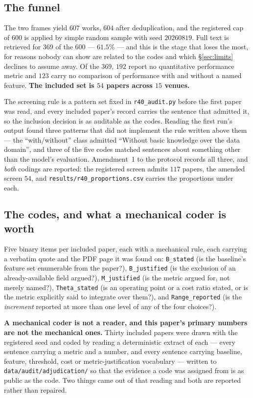 \documentclass[preprint,12pt]{elsarticle}
\begin{document}
\subsection{The funnel}
\label{sec:audit:funnel}

The two frames yield $607$ works, $604$ after deduplication, and the
registered cap of $600$ is applied by simple random sample with seed
$20260819$. Full text is retrieved for $369$ of the $600$ --- $61.5\%$ --- and
this is the stage that loses the most, for reasons nobody can show are related
to the codes and which \S\ref{sec:limits} declines to assume away. Of the
$369$, $192$ report no quantitative performance metric and $123$ carry no
comparison of performance with and without a named feature. \textbf{The
included set is $54$ papers across $15$ venues.}

The screening rule is a pattern set fixed in \texttt{r40\_audit.py} before the
first paper was read, and every included paper's record carries the sentence
that admitted it, so the inclusion decision is as auditable as the codes.
Reading the first run's output found three patterns that did not implement the
rule written above them --- the ``with\slash without'' class admitted
``Without basic knowledge over the data domain'', and three of the five codes
matched sentences about something other than the model's evaluation.
Amendment~1 to the protocol records all three, and \emph{both} codings are
reported: the registered screen admits $117$ papers, the amended screen $54$,
and \texttt{results/r40\_proportions.csv} carries the proportions under each.

\subsection{The codes, and what a mechanical coder is worth}
\label{sec:audit:codes}

Five binary items per included paper, each with a mechanical rule, each
carrying a verbatim quote and the PDF page it was found on:
\texttt{B\_stated} (is the baseline's feature set enumerable from the paper?),
\texttt{B\_justified} (is the exclusion of an already-available field
argued?), \texttt{M\_justified} (is the metric argued for, not merely named?),
\texttt{Theta\_stated} (is an operating point or a cost ratio stated, or is
the metric explicitly said to integrate over them?), and
\texttt{Range\_reported} (is the \emph{increment} reported at more than one
level of any of the four choices?).

\textbf{A mechanical coder is not a reader, and this paper's primary numbers
are not the mechanical ones.} Thirty included papers were drawn with the
registered seed and coded by reading a deterministic extract of each --- every
sentence carrying a metric and a number, and every sentence carrying baseline,
feature, threshold, cost or metric-justification vocabulary --- written to
\texttt{data/audit/adjudication/} so that the evidence a code was assigned
from is as public as the code. Two things came out of that reading and both
are reported rather than repaired.
\end{document}
